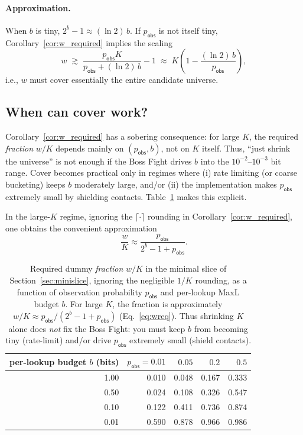 \documentclass[11pt]{article}
\begin{document}
\paragraph{Approximation.}
When $b$ is tiny, $2^b-1\approx (\ln 2)\,b$.
If $p_{\mathsf{obs}}$ is not itself tiny, Corollary~\ref{cor:w_required} implies the scaling
\[
w \;\gtrsim\; \frac{p_{\mathsf{obs}}K}{p_{\mathsf{obs}}+(\ln 2)\,b}-1 \;\approx\; K\left(1-\frac{(\ln 2)\,b}{p_{\mathsf{obs}}}\right),
\]
i.e., $w$ must cover essentially the entire candidate universe.





\subsection{When can cover work?}\label{sec:coverworks}
Corollary~\ref{cor:w_required} has a sobering consequence: for large $K$, the required \emph{fraction} $w/K$ depends mainly on $(p_{\mathsf{obs}},b)$, not on $K$ itself.
Thus, ``just shrink the universe'' is not enough if the Boss Fight drives $b$ into the $10^{-2}$--$10^{-3}$ bit range.
Cover becomes practical only in regimes where (i) rate limiting (or coarse bucketing) keeps $b$ moderately large, and/or (ii) the implementation makes $p_{\mathsf{obs}}$ extremely small by shielding contacts.
Table~\ref{tab:cover_regimes} makes this explicit.

In the large-$K$ regime, ignoring the $\lceil\cdot\rceil$ rounding in Corollary~\ref{cor:w_required}, one obtains the convenient approximation
\begin{equation}
  \label{eq:wreq}
  \frac{w}{K} \approx \frac{p_{\mathsf{obs}}}{2^b - 1 + p_{\mathsf{obs}}}.
\end{equation}


\begin{table}[t]
\centering
\small
\begin{tabular}{@{}r r r r r@{}}
\toprule
per-lookup budget $b$ (bits) & $p_{\mathsf{obs}}{=}0.01$ & $0.05$ & $0.2$ & $0.5$ \\
\midrule
1.00 & 0.010 & 0.048 & 0.167 & 0.333 \\
0.50 & 0.024 & 0.108 & 0.326 & 0.547 \\
0.10 & 0.122 & 0.411 & 0.736 & 0.874 \\
0.01 & 0.590 & 0.878 & 0.966 & 0.986 \\
\bottomrule
\end{tabular}
\caption{Required dummy \emph{fraction} $w/K$ in the minimal slice of Section~\ref{sec:minislice}, ignoring the negligible $1/K$ rounding, as a function of observation probability $p_{\mathsf{obs}}$ and per-lookup MaxL budget $b$. For large $K$, the fraction is approximately $w/K\approx p_{\mathsf{obs}}/(2^b-1+p_{\mathsf{obs}})$ (Eq.~\eqref{eq:wreq}). Thus shrinking $K$ alone does \emph{not} fix the Boss Fight: you must keep $b$ from becoming tiny (rate-limit) and/or drive $p_{\mathsf{obs}}$ extremely small (shield contacts).}
\label{tab:cover_regimes}
\end{table}
\end{document}
